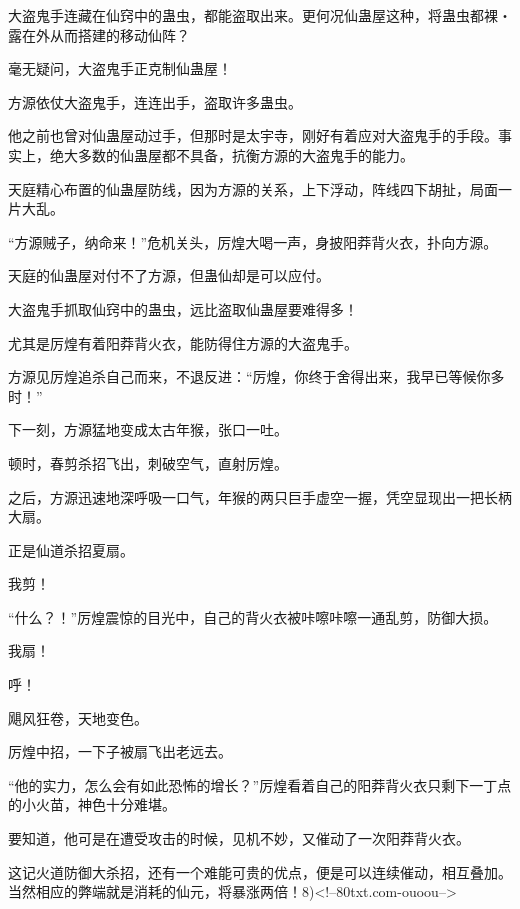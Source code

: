 \begin{this_body}
大盗鬼手连藏在仙窍中的蛊虫，都能盗取出来。更何况仙蛊屋这种，将蛊虫都裸・露在外从而搭建的移动仙阵？

毫无疑问，大盗鬼手正克制仙蛊屋！

方源依仗大盗鬼手，连连出手，盗取许多蛊虫。

他之前也曾对仙蛊屋动过手，但那时是太宇寺，刚好有着应对大盗鬼手的手段。事实上，绝大多数的仙蛊屋都不具备，抗衡方源的大盗鬼手的能力。

天庭精心布置的仙蛊屋防线，因为方源的关系，上下浮动，阵线四下胡扯，局面一片大乱。

“方源贼子，纳命来！”危机关头，厉煌大喝一声，身披阳莽背火衣，扑向方源。

天庭的仙蛊屋对付不了方源，但蛊仙却是可以应付。

大盗鬼手抓取仙窍中的蛊虫，远比盗取仙蛊屋要难得多！

尤其是厉煌有着阳莽背火衣，能防得住方源的大盗鬼手。

方源见厉煌追杀自己而来，不退反进：“厉煌，你终于舍得出来，我早已等候你多时！”

下一刻，方源猛地变成太古年猴，张口一吐。

顿时，春剪杀招飞出，刺破空气，直射厉煌。

之后，方源迅速地深呼吸一口气，年猴的两只巨手虚空一握，凭空显现出一把长柄大扇。

正是仙道杀招夏扇。

我剪！

“什么？！”厉煌震惊的目光中，自己的背火衣被咔嚓咔嚓一通乱剪，防御大损。

我扇！

呼！

飓风狂卷，天地变色。

厉煌中招，一下子被扇飞出老远去。

“他的实力，怎么会有如此恐怖的增长？”厉煌看着自己的阳莽背火衣只剩下一丁点的小火苗，神色十分难堪。

要知道，他可是在遭受攻击的时候，见机不妙，又催动了一次阳莽背火衣。

这记火道防御大杀招，还有一个难能可贵的优点，便是可以连续催动，相互叠加。当然相应的弊端就是消耗的仙元，将暴涨两倍！8)<!--80txt.com-ouoou-->

\end{this_body}

